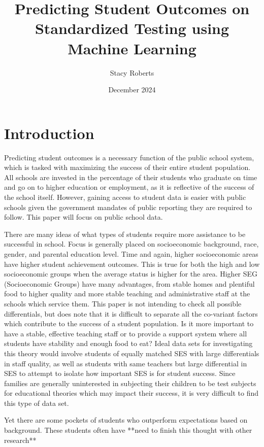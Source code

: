 \documentclass[man,12pt]{apa6} %
\title{Predicting Student Outcomes on Standardized Testing using Machine Learning}
\author{Stacy Roberts}
\affiliation{The University of Texas at Austin}
\date{December 2024}
\begin{document}
\maketitle

\section{Introduction}

Predicting student outcomes is a necessary function of the public school system, which is tasked with maximizing the success of their entire student population. All schools are invested in the percentage of their students who graduate on time and go on to higher education or employment, as it is reflective of the success of the school itself. However, gaining access to student data is easier with public schools given the government mandates of public reporting they are required to follow. \cite{ecsa} This paper will focus on public school data.

There are many ideas of what types of students require more assistance to be successful in school. Focus is generally placed on socioeconomic background, race, gender, and parental education level. \cite{Bradley2022SESgap}  Time and again, higher socioeconomic areas have higher student achievement outcomes. This is true for both the high and low socioeconomic groups when the average status is higher for the area.  Higher SEG (Socioeconomic Groups) have many advantages, from stable homes and plentiful food to higher quality and more stable teaching and administrative staff at the schools which service them. \cite{HSEffectsLongTerm} This paper is not intending to check all possible differentials, but does note that it is difficult to separate all the co-variant factors which contribute to the success of a student population. Is it more important to have a stable, effective teaching staff or to provide a support system where all students have stability and enough food to eat? Ideal data sets for investigating this theory would involve students of equally matched SES with large differentials in staff quality, as well as students with same teachers but large differential in SES to attempt to isolate how important SES is for student success. Since families are generally uninterested in subjecting their children to be test subjects for educational theories which may impact their success, it is very difficult to find this type of data set.

Yet there are some pockets of students who outperform expectations based on background. \cite{YanGaiLowSEG} These students often have **need to finish this thought with other research**
\end{document}
